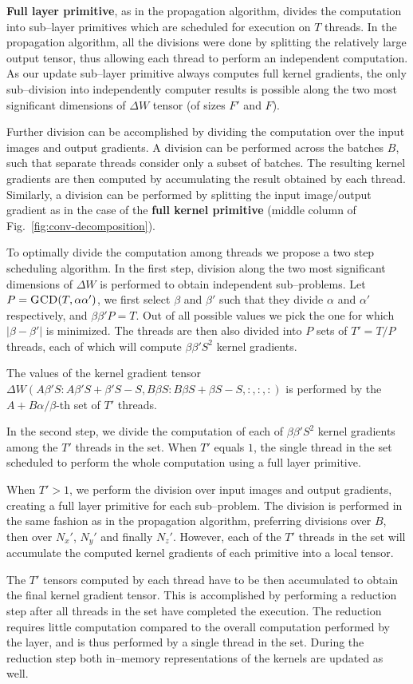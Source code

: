   {\bf Full layer primitive}, as in the propagation algorithm, divides
  the computation into sub--layer primitives which are scheduled for
  execution on $T$ threads.  In the propagation algorithm, all the
  divisions were done by splitting the relatively large output tensor,
  thus allowing each thread to perform an independent computation.  As
  our update sub--layer primitive always computes full kernel
  gradients, the only sub--division into independently computer
  results is possible along the two most significant dimensions of
  $\Delta W$ tensor (of sizes $F'$ and $F$).

  Further division can be accomplished by dividing the computation
  over the input images and output gradients.  A division can be
  performed across the batches $B$, such that separate threads
  consider only a subset of batches.  The resulting kernel gradients
  are then computed by accumulating the result obtained by each
  thread.  Similarly, a division can be performed by splitting the
  input image/output gradient as in the case of the {\bf full kernel
    primitive} (middle column of Fig.~\ref{fig:conv-decomposition}).

  To optimally divide the computation among threads we propose a two
  step scheduling algorithm.  In the first step, division along the
  two most significant dimensions of $\Delta W$ is performed to obtain
  independent sub--problems.  Let $P = \textnormal{\scshape GCD}(T,\alpha\alpha')$,
  we first select $\beta$ and $\beta'$ such that they divide $\alpha$
  and $\alpha'$ respectively, and $\beta\beta'P = T$.  Out of all
  possible values we pick the one for which $|\beta -\beta'|$ is
  minimized.  The threads are then also divided into $P$ sets of
  $T'=T/P$ threads, each of which will compute $\beta\beta'S^2$ kernel
  gradients.

  The values of the kernel gradient tensor $\Delta W(A
  \beta'S:A\beta'S+\beta'S-S,B \beta S: B\beta S + \beta S -S, :,:,:)$ is
  performed by the $A + B \alpha / \beta$-th set of $T'$ threads.

  In the second step, we divide the computation of each of
  $\beta\beta'S^2$ kernel gradients among the $T'$ threads in the set.
  When $T'$ equals $1$, the single thread in the set scheduled to
  perform the whole computation using a full layer primitive.

  When $T'>1$, we perform the division over input images and output
  gradients, creating a full layer primitive for each sub--problem.
  The division is performed in the same fashion as in the propagation
  algorithm, preferring divisions over $B$, then over $N_x'$, $N_y'$
  and finally $N_z'$.  However, each of the $T'$ threads in the set
  will accumulate the computed kernel gradients of each primitive into
  a local tensor.

  The $T'$ tensors computed by each thread have to be then accumulated
  to obtain the final kernel gradient tensor.  This is accomplished by
  performing a reduction step after all threads in the set have
  completed the execution.  The reduction requires little computation
  compared to the overall computation performed by the layer, and is
  thus performed by a single thread in the set.  During the reduction
  step both in--memory representations of the kernels are updated as
  well.

